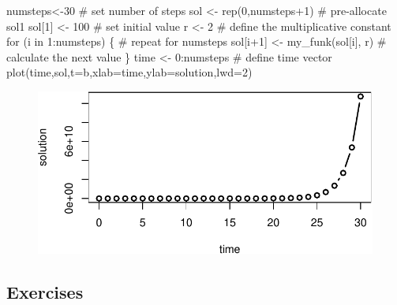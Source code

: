 \documentclass[
  letterpaper,
  DIV=11,
  numbers=noendperiod]{scrreprt}
\newenvironment{Shaded}{\begin{snugshade}}{\end{snugshade}}
\newcommand{\AttributeTok}[1]{\textcolor[rgb]{0.40,0.45,0.13}{#1}}
\newcommand{\CommentTok}[1]{\textcolor[rgb]{0.37,0.37,0.37}{#1}}
\newcommand{\ControlFlowTok}[1]{\textcolor[rgb]{0.00,0.23,0.31}{#1}}
\newcommand{\DecValTok}[1]{\textcolor[rgb]{0.68,0.00,0.00}{#1}}
\newcommand{\FunctionTok}[1]{\textcolor[rgb]{0.28,0.35,0.67}{#1}}
\newcommand{\NormalTok}[1]{\textcolor[rgb]{0.00,0.23,0.31}{#1}}
\newcommand{\OtherTok}[1]{\textcolor[rgb]{0.00,0.23,0.31}{#1}}
\newcommand{\SpecialCharTok}[1]{\textcolor[rgb]{0.37,0.37,0.37}{#1}}
\newcommand{\StringTok}[1]{\textcolor[rgb]{0.13,0.47,0.30}{#1}}
\begin{document}
\begin{Shaded}
\begin{Highlighting}[]
\NormalTok{numsteps}\OtherTok{\textless{}{-}}\DecValTok{30} \CommentTok{\# set number of steps}
\NormalTok{sol }\OtherTok{\textless{}{-}} \FunctionTok{rep}\NormalTok{(}\DecValTok{0}\NormalTok{,numsteps}\SpecialCharTok{+}\DecValTok{1}\NormalTok{) }\CommentTok{\# pre{-}allocate sol1}
\NormalTok{sol[}\DecValTok{1}\NormalTok{] }\OtherTok{\textless{}{-}} \DecValTok{100} \CommentTok{\# set initial value}
\NormalTok{r }\OtherTok{\textless{}{-}} \DecValTok{2} \CommentTok{\# define the multiplicative constant}
\ControlFlowTok{for}\NormalTok{ (i }\ControlFlowTok{in} \DecValTok{1}\SpecialCharTok{:}\NormalTok{numsteps) \{ }\CommentTok{\# repeat for numsteps}
\NormalTok{  sol[i}\SpecialCharTok{+}\DecValTok{1}\NormalTok{] }\OtherTok{\textless{}{-}} \FunctionTok{my\_funk}\NormalTok{(sol[i], r) }\CommentTok{\# calculate the next value}
\NormalTok{\}}
\NormalTok{time }\OtherTok{\textless{}{-}} \DecValTok{0}\SpecialCharTok{:}\NormalTok{numsteps }\CommentTok{\# define time vector}
\FunctionTok{plot}\NormalTok{(time,sol,}\AttributeTok{t=}\StringTok{\textquotesingle{}b\textquotesingle{}}\NormalTok{,}\AttributeTok{xlab=}\StringTok{\textquotesingle{}time\textquotesingle{}}\NormalTok{,}\AttributeTok{ylab=}\StringTok{\textquotesingle{}solution\textquotesingle{}}\NormalTok{,}\AttributeTok{lwd=}\DecValTok{2}\NormalTok{)}
\end{Highlighting}
\end{Shaded}

\begin{figure}[H]

{\centering \includegraphics{./graph_odes_files/figure-pdf/unnamed-chunk-10-1.pdf}

}

\end{figure}

\hypertarget{exercises-22}{%
\subsection{Exercises}\label{exercises-22}}
\end{document}
